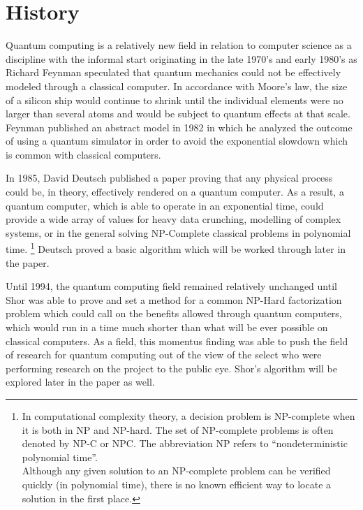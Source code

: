 \documentclass[12pt]{article}
\begin{document}
\newpage

\tableofcontents

\newpage

\section{History}

Quantum computing is a relatively new field in relation to computer science as a discipline with the informal start originating in the late 1970's and early 1980's as Richard Feynman speculated that quantum mechanics could not be effectively modeled through a classical computer. In accordance with Moore's law, the size of a silicon ship would continue to shrink until the individual elements were no larger than several atoms and would be subject to quantum effects at that scale. Feynman published an abstract model in 1982 in which he analyzed the outcome of using a quantum simulator in order to avoid the exponential slowdown which is common with classical computers.\cite{web}\par
In 1985, David Deutsch published a paper proving that any physical process could be, in theory, effectively rendered on a quantum computer. As a result, a quantum computer, which is able to operate in an exponential time, could provide a wide array of values for heavy data crunching, modelling of complex systems, or in the general solving NP-Complete classical problems in polynomial time.
\footnote{In computational complexity theory, a decision problem is NP-complete when it is both in NP and NP-hard. The set of NP-complete problems is often denoted by NP-C or NPC. The abbreviation NP refers to ``nondeterministic polynomial time''.\\Although any given solution to an NP-complete problem can be verified quickly (in polynomial time), there is no known efficient way to locate a solution in the first place.}
Deutsch proved a basic algorithm which will be worked through later in the paper. \par
Until 1994, the quantum computing field remained relatively unchanged until Shor was able to prove and set a method for a common NP-Hard factorization problem which could call on the benefits allowed through quantum computers, which would run in a time much shorter than what will be ever possible on classical computers.\cite{web} As a field, this momentus finding was able to push the field of research for quantum computing out of the view of the select who were performing research on the project to the public eye. Shor's algorithm will be explored later in the paper as well.\par
\end{document}
